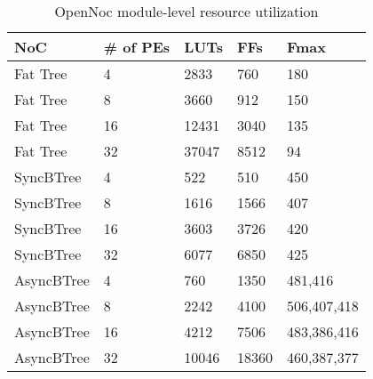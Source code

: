\begin{table}[!t]
  \centering
  \caption{OpenNoc module-level resource utilization} 
  \begin{tabular}{l|l|l|l|l}
      \toprule
      NoC & \# of PEs & LUTs & FFs & Fmax \\
      \midrule
      \midrule
	  Fat Tree & 4      & 2833 & 760 & 180   \\
      Fat Tree & 8      & 3660 & 912 & 150   \\
      Fat Tree & 16     & 12431 & 3040 & 135 \\
      Fat Tree & 32     & 37047 & 8512 & 94  \\    
      \midrule
      SyncBTree  &  4         &  522 & 510 & 450\\
      SyncBTree  &  8         &  1616 & 1566 & 407\\
      SyncBTree  &  16        &  3603 & 3726 & 420\\
      SyncBTree  &  32        &  6077 & 6850 & 425\\
	  \midrule
      AsyncBTree & 4         & 760  & 1350 & 481,416\\
      AsyncBTree & 8         & 2242 & 4100 & 506,407,418\\
      AsyncBTree & 16        & 4212 & 7506 & 483,386,416 \\
      AsyncBTree & 32        & 10046 & 18360 & 460,387,377\\
      \bottomrule
    \end{tabular}
	\label{table:systemResourceConsumption}
\end{table}